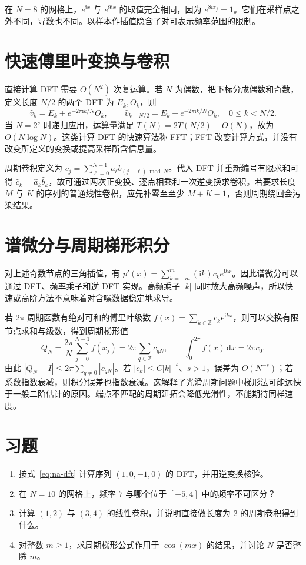 \begin{example}[样本无法识别的两种振荡]
在 $N=8$ 的网格上，$e^{\mathrm i x}$ 与 $e^{9\mathrm i x}$ 的取值完全相同，因为 $e^{8\mathrm i x_j}=1$。它们在采样点之外不同，导数也不同。以样本作插值隐含了对可表示频率范围的限制。
\end{example}

\section{快速傅里叶变换与卷积}
直接计算 DFT 需要 $O(N^2)$ 次复运算。若 $N$ 为偶数，把下标分成偶数和奇数，定义长度 $N/2$ 的两个 DFT 为 $E_k,O_k$，则
\[
 \widehat v_k=E_k+e^{-2\pi\mathrm i k/N}O_k,\qquad
 \widehat v_{k+N/2}=E_k-e^{-2\pi\mathrm i k/N}O_k,
 \quad0\le k<N/2.
\]
当 $N=2^s$ 时递归应用，运算量满足 $T(N)=2T(N/2)+O(N)$，故为 $O(N\log N)$。这类计算 DFT 的快速算法称 FFT；FFT 改变计算方式，并没有改变所定义的变换或提高采样所含信息量。

周期卷积定义为 $c_j=\sum_{\ell=0}^{N-1}a_\ell b_{(j-\ell)\bmod N}$。代入 DFT 并重新编号有限求和可得 $\widehat c_k=\widehat a_k\widehat b_k$，故可通过两次正变换、逐点相乘和一次逆变换求卷积。若要求长度 $M$ 与 $K$ 的序列的普通线性卷积，应先补零至至少 $M+K-1$，否则周期绕回会污染结果。

\section{谱微分与周期梯形积分}
对上述奇数节点的三角插值，有 $p'(x)=\sum_{k=-m}^{m}(\mathrm i k)c_ke^{\mathrm i kx}$。因此谱微分可以通过 DFT、频率乘子和逆 DFT 实现。高频乘子 $|k|$ 同时放大高频噪声，所以快速或高阶方法不意味着对含噪数据稳定地求导。

若 $2\pi$ 周期函数有绝对可和的傅里叶级数 $f(x)=\sum_{k\in\mathbb Z}c_ke^{\mathrm i kx}$，则可以交换有限节点求和与级数，得到周期梯形值
\[
 Q_N=\frac{2\pi}{N}\sum_{j=0}^{N-1}f(x_j)=2\pi\sum_{q\in\mathbb Z}c_{qN},\qquad
 \int_0^{2\pi}f(x)\,\mathrm dx=2\pi c_0.
\]
由此 $|Q_N-I|\le2\pi\sum_{q\ne0}|c_{qN}|$。若 $|c_k|\le C|k|^{-s}$、$s>1$，误差为 $O(N^{-s})$；若系数指数衰减，则积分误差也指数衰减。这解释了光滑周期问题中梯形法可能远快于一般二阶估计的原因。端点不匹配的周期延拓会降低光滑性，不能期待同样速度。

\section{习题}
\begin{enumerate}[label=\arabic*.]
\item\label{exr:na-fft-transform} 按式~\eqref{eq:na-dft} 计算序列 $(1,0,-1,0)$ 的 DFT，并用逆变换核验。
\item\label{exr:na-fft-alias} 在 $N=10$ 的网格上，频率 $7$ 与哪个位于 $[-5,4]$ 中的频率不可区分？
\item\label{exr:na-fft-convolution} 计算 $(1,2)$ 与 $(3,4)$ 的线性卷积，并说明直接做长度为 $2$ 的周期卷积得到什么。
\item\label{exr:na-fft-periodic} 对整数 $m\ge1$，求周期梯形公式作用于 $\cos(mx)$ 的结果，并讨论 $N$ 是否整除 $m$。
\end{enumerate}

